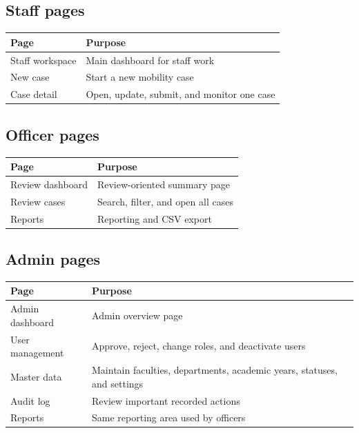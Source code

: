 \documentclass[11pt,a4paper]{article}
\begin{document}
\subsection*{Staff pages}
\begin{longtable}{>{\raggedright\arraybackslash}p{4cm} >{\raggedright\arraybackslash}p{9.3cm}}
\rowcolor{swusurface}\textbf{Page} & \textbf{Purpose} \\
\midrule
Staff workspace & Main dashboard for staff work \\
New case & Start a new mobility case \\
Case detail & Open, update, submit, and monitor one case \\
\end{longtable}

\subsection*{Officer pages}
\begin{longtable}{>{\raggedright\arraybackslash}p{4cm} >{\raggedright\arraybackslash}p{9.3cm}}
\rowcolor{swusurface}\textbf{Page} & \textbf{Purpose} \\
\midrule
Review dashboard & Review-oriented summary page \\
Review cases & Search, filter, and open all cases \\
Reports & Reporting and CSV export \\
\end{longtable}

\subsection*{Admin pages}
\begin{longtable}{>{\raggedright\arraybackslash}p{4cm} >{\raggedright\arraybackslash}p{9.3cm}}
\rowcolor{swusurface}\textbf{Page} & \textbf{Purpose} \\
\midrule
Admin dashboard & Admin overview page \\
User management & Approve, reject, change roles, and deactivate users \\
Master data & Maintain faculties, departments, academic years, statuses, and settings \\
Audit log & Review important recorded actions \\
Reports & Same reporting area used by officers \\
\end{longtable}
\end{document}
